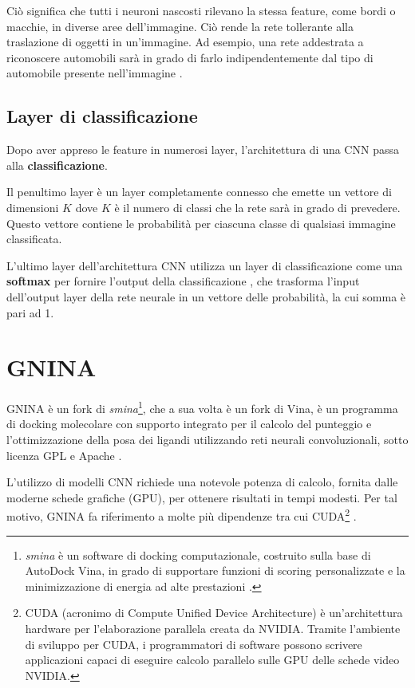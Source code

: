 Ciò significa che tutti i neuroni nascosti rilevano la stessa feature, come bordi o macchie, in diverse aree dell’immagine. Ciò rende la rete tollerante alla traslazione di oggetti in un’immagine. Ad esempio, una rete addestrata a riconoscere automobili sarà in grado di farlo indipendentemente dal tipo di automobile presente nell’immagine \cite{mathworks_cnn}.

\subsection{Layer di classificazione}
Dopo aver appreso le feature in numerosi layer, l’architettura di una CNN passa alla \textbf{classificazione}.

Il penultimo layer è un layer completamente connesso che emette un vettore di dimensioni \(K\) dove \(K\) è il numero di classi che la rete sarà in grado di prevedere. Questo vettore contiene le probabilità per ciascuna classe di qualsiasi immagine classificata.

L’ultimo layer dell’architettura CNN utilizza un layer di classificazione come una \textbf{softmax} per fornire l’output della classificazione \cite{mathworks_cnn}, che trasforma l'input dell'output layer della rete neurale in un vettore delle probabilità, la cui somma è pari ad 1.


\section{GNINA}
GNINA è un fork di \textit{smina}\footnote{\textit{smina} è un software di docking computazionale, costruito sulla base di AutoDock Vina, in grado di supportare funzioni di scoring personalizzate e la minimizzazione di energia ad alte prestazioni \cite{koes_lessons_2013}.}, che a sua volta è un fork di Vina, è un programma di docking molecolare con supporto integrato per il calcolo del punteggio e l'ottimizzazione della posa dei ligandi utilizzando reti neurali convoluzionali, sotto licenza GPL e Apache \cite{mcnutt_gnina_2021}. 

L'utilizzo di modelli CNN richiede una notevole potenza di calcolo, fornita dalle moderne schede grafiche (GPU), per ottenere risultati in tempi modesti. Per tal motivo, GNINA fa riferimento a molte più dipendenze tra cui CUDA\footnote{CUDA (acronimo di Compute Unified Device Architecture) è un'architettura hardware per l'elaborazione parallela creata da NVIDIA. Tramite l'ambiente di sviluppo per CUDA, i programmatori di software possono scrivere applicazioni capaci di eseguire calcolo parallelo sulle GPU delle schede video NVIDIA.} \cite{mcnutt_gnina_2021}.

